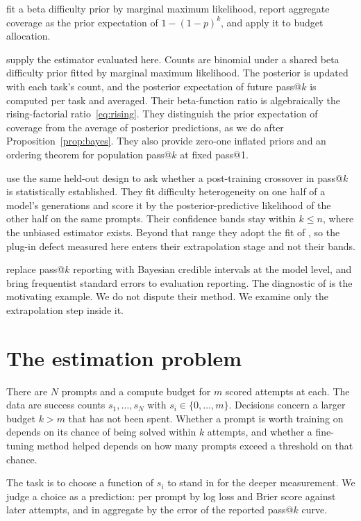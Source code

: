 \documentclass[11pt]{article}
\theoremstyle{itheads}
\begin{document}
\citet{kazdan2025} fit a beta difficulty prior by marginal maximum
likelihood, report aggregate coverage as the prior expectation of
$1-(1-p)^k$, and apply it to budget allocation.

\citet{verine2026} supply the estimator evaluated here. Counts are
binomial under a shared beta difficulty prior fitted by marginal
maximum likelihood. The posterior is updated with each task's count,
and the posterior expectation of future pass@$k$ is computed per
task and averaged. Their beta-function ratio is algebraically the
rising-factorial ratio~\eqref{eq:rising}. They distinguish the prior
expectation of coverage from the average of posterior predictions,
as we do after Proposition~\ref{prop:bayes}. They also provide
zero-one inflated priors and an ordering theorem for population
pass@$k$ at fixed pass@1.

\citet{yang2026} use the same held-out design to ask whether a
post-training crossover in pass@$k$ is statistically established.
They fit difficulty heterogeneity on one half of a model's
generations and score it by the posterior-predictive likelihood of
the other half on the same prompts. Their confidence bands stay
within $k \le n$, where the unbiased estimator exists. Beyond that
range they adopt the fit of \citet{kazdan2025}, so the plug-in
defect measured here enters their extrapolation stage and not their
bands.

\citet{hariri2025} replace pass@$k$ reporting with Bayesian credible
intervals at the model level, and \citet{miller2024} bring
frequentist standard errors to evaluation reporting. The diagnostic
of \citet{malladi2026} is the motivating example. We do not dispute
their method. We examine only the extrapolation step inside it.

\section{The estimation problem}

There are $N$ prompts and a compute budget for $m$ scored attempts
at each. The data are success counts $s_1, \dots, s_N$ with
$s_i \in \{0, \dots, m\}$. Decisions concern a larger budget $k > m$
that has not been spent. Whether a prompt is worth training on
depends on its chance of being solved within $k$ attempts, and
whether a fine-tuning method helped depends on how many prompts
exceed a threshold on that chance.

The task is to choose a function of $s_i$ to stand in for the deeper
measurement. We judge a choice as a prediction: per prompt by log
loss and Brier score against later attempts, and in aggregate by the
error of the reported pass@$k$ curve.
\end{document}
